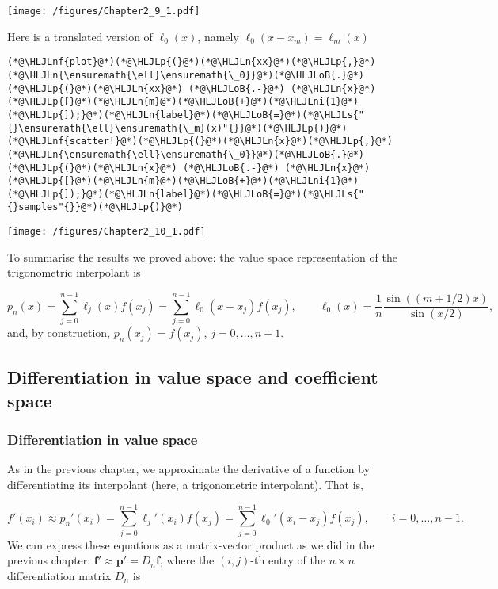 \documentclass[12pt,landscape]{article}
\newcommand{\HLJLn}[1]{#1}
\newcommand{\HLJLnf}[1]{\textcolor[RGB]{66,102,213}{#1}}
\newcommand{\HLJLs}[1]{\textcolor[RGB]{201,61,57}{#1}}
\newcommand{\HLJLni}[1]{\textcolor[RGB]{59,151,46}{#1}}
\newcommand{\HLJLoB}[1]{\textcolor[RGB]{102,102,102}{\textbf{#1}}}
\newcommand{\HLJLp}[1]{#1}
\begin{document}
{\texttt{[image: /figures/Chapter2\_9\_1.pdf]}

Here is a translated version of $\ell_0(x)$, namely $\ell_0(x-x_{m}) = \ell_{m}(x)$


\begin{lstlisting}
(*@\HLJLnf{plot}@*)(*@\HLJLp{(}@*)(*@\HLJLn{xx}@*)(*@\HLJLp{,}@*)(*@\HLJLn{\ensuremath{\ell}\ensuremath{\_0}}@*)(*@\HLJLoB{.}@*)(*@\HLJLp{(}@*)(*@\HLJLn{xx}@*) (*@\HLJLoB{.-}@*) (*@\HLJLn{x}@*)(*@\HLJLp{[}@*)(*@\HLJLn{m}@*)(*@\HLJLoB{+}@*)(*@\HLJLni{1}@*)(*@\HLJLp{]);}@*)(*@\HLJLn{label}@*)(*@\HLJLoB{=}@*)(*@\HLJLs{"{}\ensuremath{\ell}\ensuremath{\_m}(x)"{}}@*)(*@\HLJLp{)}@*)
(*@\HLJLnf{scatter!}@*)(*@\HLJLp{(}@*)(*@\HLJLn{x}@*)(*@\HLJLp{,}@*)(*@\HLJLn{\ensuremath{\ell}\ensuremath{\_0}}@*)(*@\HLJLoB{.}@*)(*@\HLJLp{(}@*)(*@\HLJLn{x}@*) (*@\HLJLoB{.-}@*) (*@\HLJLn{x}@*)(*@\HLJLp{[}@*)(*@\HLJLn{m}@*)(*@\HLJLoB{+}@*)(*@\HLJLni{1}@*)(*@\HLJLp{]);}@*)(*@\HLJLn{label}@*)(*@\HLJLoB{=}@*)(*@\HLJLs{"{}samples"{}}@*)(*@\HLJLp{)}@*)
\end{lstlisting}

\texttt{[image: /figures/Chapter2\_10\_1.pdf]}

To summarise the results we proved above: the value space representation of the trigonometric interpolant is

\[
p_n(x) = \sum_{j=0}^{n-1}\ell_j(x)f(x_j) = \sum_{j=0}^{n-1}\ell_0(x-x_j)f(x_j), \qquad \ell_0(x) = \frac{1}{n}\frac{\sin((m+1/2)x)}{\sin(x/2)},
\]
and, by construction, $p_n(x_j) = f(x_j)$, $j = 0, \ldots, n-1$.

\subsection{Differentiation in value space and coefficient space}
\subsubsection{Differentiation in value space}
As in the previous chapter, we approximate the derivative of a function by differentiating its interpolant (here, a trigonometric interpolant). That is,

\[
f'(x_i) \approx p_n'(x_i) = \sum_{j=0}^{n-1}\ell_{j}'(x_i) f(x_{j})  = \sum_{j=0}^{n-1}\ell_{0}'(x_i-x_j)f(x_{j}), \qquad i = 0, \ldots, n-1.
\]
We can express these equations as a matrix-vector product as we did in the previous chapter: $\mathbf{f}' \approx \mathbf{p}' = D_n \mathbf{f}$, where the $(i,j)$-th entry of the $n \times n$ differentiation matrix $D_n$ is

}
\end{document}
